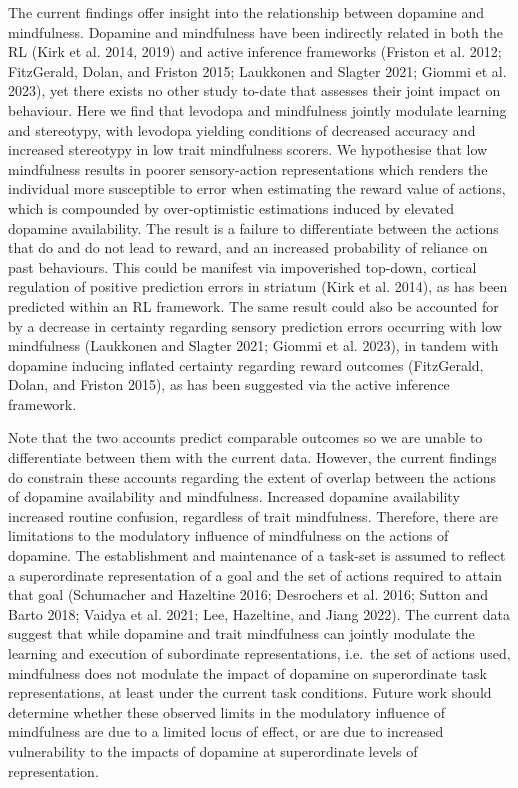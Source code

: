 \documentclass{article}
\begin{document}
The current findings offer insight into the relationship between
dopamine and mindfulness. Dopamine and mindfulness have been indirectly
related in both the RL (Kirk et al. 2014, 2019) and active inference
frameworks (Friston et al. 2012; FitzGerald, Dolan, and Friston 2015;
Laukkonen and Slagter 2021; Giommi et al. 2023), yet there exists no
other study to-date that assesses their joint impact on behaviour. Here
we find that levodopa and mindfulness jointly modulate learning and
stereotypy, with levodopa yielding conditions of decreased accuracy and
increased stereotypy in low trait mindfulness scorers. We hypothesise
that low mindfulness results in poorer sensory-action representations
which renders the individual more susceptible to error when estimating
the reward value of actions, which is compounded by over-optimistic
estimations induced by elevated dopamine availability. The result is a
failure to differentiate between the actions that do and do not lead to
reward, and an increased probability of reliance on past behaviours.
This could be manifest via impoverished top-down, cortical regulation of
positive prediction errors in striatum (Kirk et al. 2014), as has been
predicted within an RL framework. The same result could also be
accounted for by a decrease in certainty regarding sensory prediction
errors occurring with low mindfulness (Laukkonen and Slagter 2021;
Giommi et al. 2023), in tandem with dopamine inducing inflated certainty
regarding reward outcomes (FitzGerald, Dolan, and Friston 2015), as has
been suggested via the active inference framework.

Note that the two accounts predict comparable outcomes so we are unable
to differentiate between them with the current data. However, the
current findings do constrain these accounts regarding the extent of
overlap between the actions of dopamine availability and mindfulness.
Increased dopamine availability increased routine confusion, regardless
of trait mindfulness. Therefore, there are limitations to the modulatory
influence of mindfulness on the actions of dopamine. The establishment
and maintenance of a task-set is assumed to reflect a superordinate
representation of a goal and the set of actions required to attain that
goal (Schumacher and Hazeltine 2016; Desrochers et al. 2016; Sutton and
Barto 2018; Vaidya et al. 2021; Lee, Hazeltine, and Jiang 2022). The
current data suggest that while dopamine and trait mindfulness can
jointly modulate the learning and execution of subordinate
representations, i.e.~the set of actions used, mindfulness does not
modulate the impact of dopamine on superordinate task representations,
at least under the current task conditions. Future work should determine
whether these observed limits in the modulatory influence of mindfulness
are due to a limited locus of effect, or are due to increased
vulnerability to the impacts of dopamine at superordinate levels of
representation.
\end{document}
